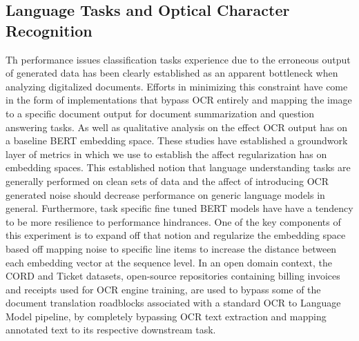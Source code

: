 \documentclass{article}
\begin{document}
\subsection{Language Tasks and Optical Character Recognition}
Th performance issues classification tasks experience due to the erroneous output of generated  data has been clearly established as an apparent bottleneck when analyzing digitalized documents. Efforts in minimizing this constraint have come in the form of implementations that bypass OCR entirely and mapping the image to a specific document output for document summarization and question answering tasks. As well as qualitative analysis on the effect OCR output has on a baseline BERT embedding space. These studies have established a groundwork layer of metrics in which we use to establish the affect regularization has on embedding spaces. This established notion that language understanding tasks are generally performed on clean sets of data and the affect of introducing OCR generated noise should decrease performance on generic language models in general. Furthermore, task specific fine tuned BERT models have have a tendency to be more resilience to performance hindrances. One of the key components of this experiment is to expand off that notion and regularize  the embedding space based off mapping noise to specific line items to increase the distance between each embedding vector at the sequence level. In an open domain context, the CORD and Ticket datasets, open-source repositories containing billing invoices and receipts used for OCR engine training, are used to bypass some of the document translation roadblocks associated with a standard OCR to Language Model pipeline, by completely bypassing OCR text extraction and mapping annotated text to its respective downstream task.
\end{document}
